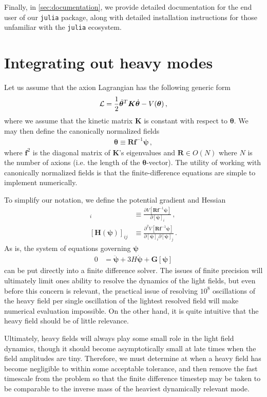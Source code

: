 \documentclass[11pt]{article}
\begin{document}
Finally, in \cref{sec:documentation}, we provide detailed documentation for the end user of our \texttt{julia} package, along with detailed installation instructions for those unfamiliar with the \texttt{julia} ecosystem.

\section{Integrating out heavy modes}\label{sec:integrating_out_heavy_modes}
Let us assume that the axion Lagrangian has the following generic form
\begin{align}
    {\cal L} = \frac12\dot{\bm\theta}^T{\bm K}\dot{\bm\theta} - V(\bm\theta)\,,
\end{align}
where we assume that the kinetic matrix ${\bm K}$ is constant with respect to $\bm\theta$. We may then define the canonically normalized fields
\begin{align}
    {\bm\theta}\equiv \bm R\bm f^{-1}\bm \psi\,,
\end{align}
where $\bm f^2$ is the diagonal matrix of $\bm K$'s eigenvalues and $\bm R\in O(N)$ where $N$ is the number of axions (i.e. the length of the $\bm\theta$-vector). The utility of working with canonically normalized fields is that the finite-difference equations are simple to implement numerically.

To simplify our notation, we define the potential gradient and Hessian
\begin{align}
    [\bm G(\bm\psi)]_i&\equiv \frac{\partial V[{\bm R}{\bm f}^{-1}{\bm \psi}]}{\partial{[\bm \psi]_i}}\,,\\
    [\bm H(\bm\psi)]_{ij}&\equiv \frac{\partial^2 V[{\bm R}{\bm f}^{-1}{\bm \psi}]}{\partial{[\bm \psi]_i}\partial{[\bm \psi]_j}}\,.
\end{align}
As is, the system of equations governing $\bm\psi$
\begin{align}
    0&=\ddot{\bm\psi} + 3 H\dot{\bm\psi} + \bm G[{\bm\psi}]
\end{align}
can be put directly into a finite difference solver. The issues of finite precision will ultimately limit ones ability to resolve the dynamics of the light fields, but even before this concern is relevant, the practical issue of resolving $10^8$ oscillations of the heavy field per single oscillation of the lightest resolved field will make numerical evaluation impossible. On the other hand, it is quite intuitive that the heavy field should be of little relevance. 

Ultimately, heavy fields will always play some small role in the light field dynamics, though it should become asymptotically small at late times when the field amplitudes are tiny. Therefore, we must determine at when a heavy field has become negligible to within some acceptable tolerance, and then remove the fast timescale from the problem so that the finite difference timestep may be taken to be comparable to the inverse mass of the heaviest dynamically relevant mode.
\end{document}
